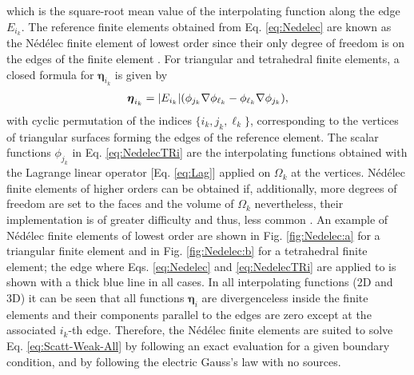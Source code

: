 %
which is the square-root mean value of the interpolating function along the edge $E_{i_k}$. The reference finite elements obtained from Eq. \eqref{eq:Nedelec} are known as the Nédélec finite element of lowest order since their only degree of freedom is on the edges of the finite element \cite{bergot_generation_2010}. For triangular and tetrahedral finite elements, a closed formula for $\boldsymbol{\eta}_{i_k}$ is given by \cite{jin_theory_2010,larson_finite_2013,bondeson_computational_2005}
%
\begin{align}
    \boldsymbol{\eta}_{i_k} = \abs{E_{i_k}} \qty(\phi_{j_k}\nabla\phi_{\ell_k}
                                                    - \phi_{\ell_k}\nabla\phi_{j_k} ),
    \label{eq:NedelecTRi}
\end{align}
%
%
%
with cyclic permutation of the indices $\{i_k, j_k, \ell_k\}$, corresponding to the vertices of triangular surfaces forming  the edges of the reference element. The scalar functions $\phi_{j_k}$ in Eq. \eqref{eq:NedelecTRi}  are the interpolating functions obtained with the Lagrange linear operator [Eq. \eqref{eq:Lag}] applied on $\Omega_k$ at the vertices. Nédélec finite elements of higher orders can be obtained if, additionally, more degrees of freedom are set to the faces and the volume of $\Omega_k$ \cite{bergot_generation_2010} nevertheless, their implementation is of greater difficulty and thus, less common \cite{larson_finite_2013,jin_theory_2010}. An example of Nédélec finite elements of lowest order are shown in Fig. \ref{fig:Nedelec:a} for a triangular finite element and in Fig. \ref{fig:Nedelec:b} for a tetrahedral finite element; the edge where Eqs. \eqref{eq:Nedelec} and \eqref{eq:NedelecTRi} are applied to is shown with a thick blue line in all cases. In all interpolating functions (2D and 3D) it can be seen that all functions $\boldsymbol{\eta}_i$ are divergenceless inside the finite elements and their components parallel to the edges are zero except at the associated $i_k$-th edge. Therefore, the Nédélec finite elements are suited to solve Eq. \eqref{eq:Scatt-Weak-All}  by following an exact evaluation for a given boundary condition, and by following the electric Gauss's law with no sources.


